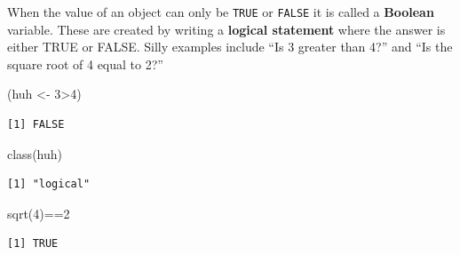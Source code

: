 \documentclass[
  letterpaper,
  DIV=11,
  numbers=noendperiod,
  oneside]{scrreprt}
\newenvironment{Shaded}{\begin{snugshade}}{\end{snugshade}}
\newcommand{\DecValTok}[1]{\textcolor[rgb]{0.68,0.00,0.00}{#1}}
\newcommand{\FunctionTok}[1]{\textcolor[rgb]{0.28,0.35,0.67}{#1}}
\newcommand{\NormalTok}[1]{\textcolor[rgb]{0.00,0.23,0.31}{#1}}
\newcommand{\OtherTok}[1]{\textcolor[rgb]{0.00,0.23,0.31}{#1}}
\newcommand{\SpecialCharTok}[1]{\textcolor[rgb]{0.37,0.37,0.37}{#1}}
\begin{document}
When the value of an object can only be \texttt{TRUE} or \texttt{FALSE}
it is called a \textbf{Boolean} variable. These are created by writing a
\textbf{logical statement} where the answer is either TRUE or FALSE.
Silly examples include ``Is 3 greater than 4?'' and ``Is the square root
of 4 equal to 2?''

\begin{Shaded}
\begin{Highlighting}[]
\NormalTok{(huh }\OtherTok{\textless{}{-}} \DecValTok{3}\SpecialCharTok{\textgreater{}}\DecValTok{4}\NormalTok{)}
\end{Highlighting}
\end{Shaded}

\begin{verbatim}
[1] FALSE
\end{verbatim}

\begin{Shaded}
\begin{Highlighting}[]
\FunctionTok{class}\NormalTok{(huh)}
\end{Highlighting}
\end{Shaded}

\begin{verbatim}
[1] "logical"
\end{verbatim}

\begin{Shaded}
\begin{Highlighting}[]
\FunctionTok{sqrt}\NormalTok{(}\DecValTok{4}\NormalTok{)}\SpecialCharTok{==}\DecValTok{2}
\end{Highlighting}
\end{Shaded}

\begin{verbatim}
[1] TRUE
\end{verbatim}
\end{document}
